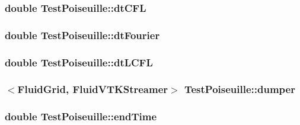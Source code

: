\subsubsection[{dt\+C\+F\+L}]{\setlength{\rightskip}{0pt plus 5cm}double Test\+Poiseuille\+::dt\+C\+F\+L\hspace{0.3cm}{\ttfamily [protected]}}\label{class_test_poiseuille_a54e0785218e3e68132f9871f653867b7}
\hypertarget{class_test_poiseuille_aa08d9d6fe14efb0de6bd60ff6e4da1b0}{}
\subsubsection[{dt\+Fourier}]{\setlength{\rightskip}{0pt plus 5cm}double Test\+Poiseuille\+::dt\+Fourier\hspace{0.3cm}{\ttfamily [protected]}}\label{class_test_poiseuille_aa08d9d6fe14efb0de6bd60ff6e4da1b0}
\hypertarget{class_test_poiseuille_a5ac66de31bd4568ddcf483b46d0b52aa}{}
\subsubsection[{dt\+L\+C\+F\+L}]{\setlength{\rightskip}{0pt plus 5cm}double Test\+Poiseuille\+::dt\+L\+C\+F\+L\hspace{0.3cm}{\ttfamily [protected]}}\label{class_test_poiseuille_a5ac66de31bd4568ddcf483b46d0b52aa}
\hypertarget{class_test_poiseuille_a91f78c712e3c9181fe8c0c57c7a361a9}{}
\subsubsection[{dumper}]{$<${\bf Fluid\+Grid}, {\bf Fluid\+V\+T\+K\+Streamer}$>$ Test\+Poiseuille\+::dumper\hspace{0.3cm}{\ttfamily [protected]}}\label{class_test_poiseuille_a91f78c712e3c9181fe8c0c57c7a361a9}
\hypertarget{class_test_poiseuille_a15f483bc7a330049328759a09b0a1c8a}{}
\subsubsection[{end\+Time}]{\setlength{\rightskip}{0pt plus 5cm}double Test\+Poiseuille\+::end\+Time\hspace{0.3cm}{\ttfamily [protected]}}\label{class_test_poiseuille_a15f483bc7a330049328759a09b0a1c8a}
\hypertarget{class_test_poiseuille_a6386bbb4b0e5cf8e57a1c6927f2571bc}{}
